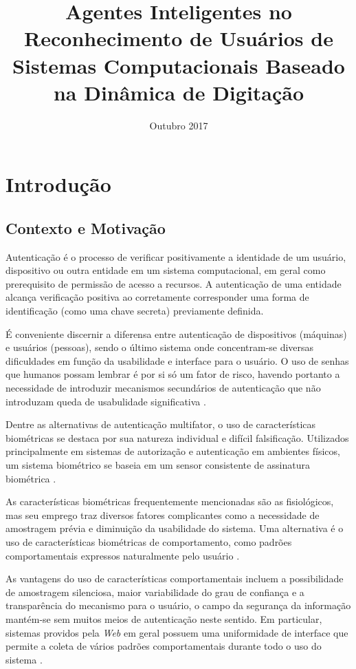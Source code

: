 \documentclass[pfc]{imetex}
\title{Agentes Inteligentes no Reconhecimento de Usuários de Sistemas Computacionais Baseado na Dinâmica de Digitação}
\date{Outubro 2017}
\begin{document}
\chapter{Introdução}

\section{Contexto e Motivação}
Autenticação é o processo de verificar positivamente a identidade de um usuário, dispositivo ou outra entidade em um sistema computacional, em geral como prerequisito de permissão de acesso a recursos. A autenticação de uma entidade alcança verificação positiva ao corretamente corresponder uma forma de identificação (como uma chave secreta) previamente definida. \cite{OGorman2003}

É conveniente discernir a diferensa entre autenticação de dispositivos (máquinas) e usuários (pessoas), sendo o último sistema onde concentram-se diversas dificuldades em função da usabilidade e interface para o usuário. \cite{OGorman2003} O uso de senhas que humanos possam lembrar é por si só um fator de risco, havendo portanto a necessidade de introduzir mecanismos secundários de autenticação que não introduzam queda de usabulidade significativa \cite{Morris1979}.


Dentre as alternativas de autenticação multifator, o uso de características biométricas se destaca por sua natureza individual e difícil falsificação. Utilizados principalmente em sistemas de autorização e autenticação em ambientes físicos, um sistema biométrico se baseia em um sensor consistente de assinatura biométrica \cite{EdDawson2003}.

As características biométricas frequentemente mencionadas são as fisiológicos, mas seu emprego traz diversos fatores complicantes como a necessidade de amostragem prévia e diminuição da usabilidade do sistema. Uma alternativa é o uso de características biométricas de comportamento, como padrões comportamentais expressos naturalmente pelo usuário \cite{Moskovitch2009}.

As vantagens do uso de características comportamentais incluem a possibilidade de amostragem silenciosa, maior variabilidade do grau de confiança e a transparência do mecanismo para o usuário, o campo da segurança da informação mantém-se sem muitos meios de autenticação neste sentido. Em particular, sistemas providos pela \textit{Web} em geral possuem uma uniformidade de interface que permite a coleta de vários padrões comportamentais durante todo o uso do sistema \cite{Moskovitch2009}.	
\end{document}
